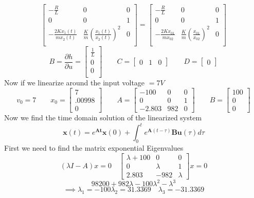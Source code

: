 \documentclass{article}
\begin{document}
\begin{enumerate}[a.]
$$\begin{bmatrix}
-\frac{R}{L} & 0 & 0\\
0 & 0 & 1\\
-\frac{2Kx_1(t)}{mx_2(t)} & \frac{K}{m}(\frac{x_1(t)}{x_2(t)})^2 & 0\\
\end{bmatrix}
=
\begin{bmatrix}
-\frac{R}{L} & 0 & 0\\
0 & 0 & 1\\
-\frac{2Kx_{01}}{mx_{02}} & \frac{K}{m}(\frac{x_{01}}{x_{02}})^2 & 0\\
\end{bmatrix}
$$
$$
B
=
\frac{\partial h}{\partial u}
=
\begin{bmatrix}
\frac{1}{L} \\
0 \\
0 \\
\end{bmatrix}
\qquad
C
=
\begin{bmatrix}
0 & 1 & 0
\end{bmatrix}
\qquad
D
=
\begin{bmatrix}
0
\end{bmatrix}
$$
Now if we linearize around the input voltage $= 7V$
$$
v_0 = 7 \qquad
x_0
=
\begin{bmatrix}
7 \\
.00998 \\
0
\end{bmatrix}
\qquad
A
=
\begin{bmatrix}
-100 & 0 & 0 \\
0 & 0 & 1 \\
-2.803 & 982 & 0
\end{bmatrix}
\qquad
B
=
\begin{bmatrix}
100 \\
0 \\
0
\end{bmatrix}
$$
Now we find the time domain solution of the linearized system
$$
\mathbf{x}(t)
=
e^{\mathbf{At}}\mathbf{x}(0) + \int_0^t e^{\mathbf{A}(t-\tau)}\mathbf{B}\mathbf{u}(\tau) d\tau
$$
First we need to find the matrix exponential
\newline
Eigenvalues
$$
(\lambda I - A)x = 0
\quad
\begin{bmatrix}
\lambda + 100 & 0 & 0 \\
0 & \lambda & 1 \\
2.803 & -982 & \lambda
\end{bmatrix}
x = 0
$$
$$
98200 + 982 \lambda - 100 \lambda^2 - \lambda^3
$$
$$
\implies \lambda_1 = -100 \lambda_2 = 31.3369 \quad \lambda_3 = -31.3369
$$
\end{enumerate}
\end{document}
